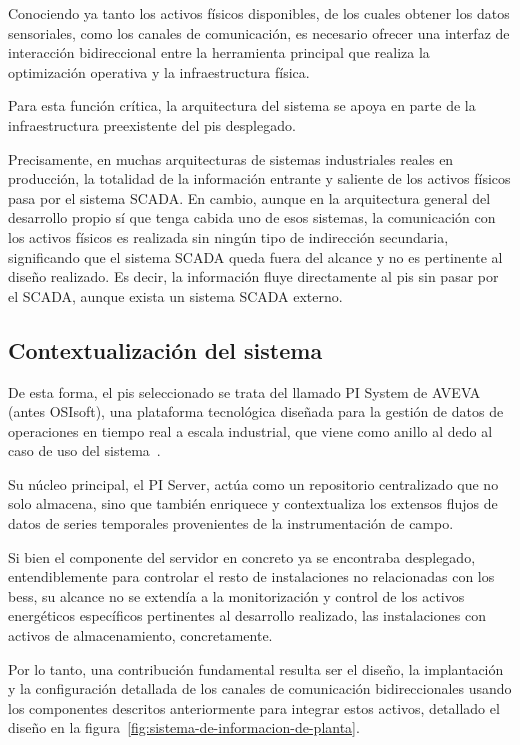 Conociendo ya tanto los activos físicos disponibles, de los cuales obtener los datos sensoriales, como los canales de comunicación, es necesario ofrecer una interfaz de interacción bidireccional entre la herramienta principal que realiza la optimización operativa y la infraestructura física.

Para esta función crítica, la arquitectura del sistema se apoya en parte de la infraestructura preexistente del \gls{pis} desplegado.

Precisamente, en muchas arquitecturas de sistemas industriales reales en producción, la totalidad de la información entrante y saliente de los activos físicos pasa por el sistema SCADA\@. En cambio, aunque en la arquitectura general del desarrollo propio sí que tenga cabida uno de esos sistemas, la comunicación con los activos físicos es realizada sin ningún tipo de indirección secundaria, significando que el sistema SCADA queda fuera del alcance y no es pertinente al diseño realizado. Es decir, la información fluye directamente al \gls{pis} sin pasar por el SCADA\@, aunque exista un sistema SCADA externo.

\subsection{Contextualización del sistema}%
\label{makereference3.4.1}

De esta forma, el \gls{pis} seleccionado se trata del llamado PI System de AVEVA (antes OSIsoft), una plataforma tecnológica diseñada para la gestión de datos de operaciones en tiempo real a escala industrial, que viene como anillo al dedo al caso de uso del sistema~\cite{aveva2025aveva}.

Su núcleo principal, el PI Server, actúa como un repositorio centralizado que no solo almacena, sino que también enriquece y contextualiza los extensos flujos de datos de series temporales provenientes de la instrumentación de campo.

Si bien el componente del servidor en concreto ya se encontraba desplegado, entendiblemente para controlar el resto de instalaciones no relacionadas con los \gls{bess}, su alcance no se extendía a la monitorización y control de los activos energéticos específicos pertinentes al desarrollo realizado, las instalaciones con activos de almacenamiento, concretamente.

Por lo tanto, una contribución fundamental resulta ser el diseño, la implantación y la configuración detallada de los canales de comunicación bidireccionales usando los componentes descritos anteriormente para integrar estos activos, detallado el diseño en la figura~\ref{fig:sistema-de-informacion-de-planta}.

